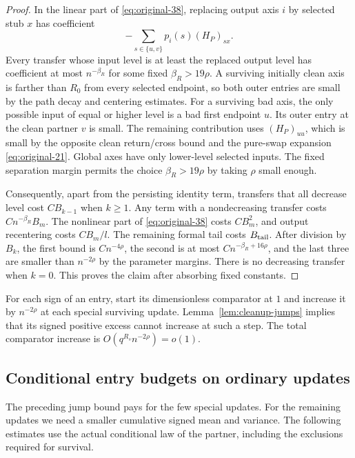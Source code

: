 \begin{proof}
In the linear part of \eqref{eq:original-38}, replacing output
axis $i$ by selected stub $x$ has coefficient
\[
 -\sum_{s\in\{u,v\}}p_i(s)(H_P)_{sx}.
\]
Every transfer whose input level is at least the replaced
output level has coefficient at most $n^{-\beta_R}$ for some
fixed $\beta_R>19\rho$.  A surviving initially clean axis is
farther than $R_0$ from every selected endpoint, so both outer
entries are small by the path decay and centering estimates.
For a surviving bad axis, the only possible input of equal or
higher level is a bad first endpoint $u$.  Its outer entry at
the clean partner $v$ is small.  The remaining contribution
uses $(H_P)_{uu}$, which is small by the opposite clean
return/cross bound and the pure-swap expansion
\eqref{eq:original-21}.  Global axes have only lower-level
selected inputs.  The fixed separation margin permits the
choice $\beta_R>19\rho$ by taking $\rho$ small enough.

Consequently, apart from the persisting identity term, transfers
that all decrease level cost $CB_{k-1}$ when $k\geq1$.
Any term with a nondecreasing transfer costs
$Cn^{-\beta_R}B_m$.  The nonlinear part of
\eqref{eq:original-38} costs $CB_m^2$, and output recentering
costs $CB_m/l$.  The remaining formal tail costs $B_{\rm tail}$.
After division by $B_k$, the first bound is $Cn^{-4\rho}$,
the second is at most $Cn^{-\beta_R+16\rho}$, and the last
three are smaller than $n^{-2\rho}$ by the parameter margins.
There is no decreasing transfer when $k=0$.  This proves the
claim after absorbing fixed constants.
\end{proof}

For each sign of an entry, start its dimensionless comparator
at $1$ and increase it by $n^{-2\rho}$ at each special
surviving update.  Lemma~\ref{lem:cleanup-jumps} implies that
its signed positive excess cannot increase at such a step.
The total comparator increase is
$O(q^{R_s}n^{-2\rho})=o(1)$.

\subsection{Conditional entry budgets on ordinary updates}

The preceding jump bound pays for the few special updates.  For the
remaining updates we need a smaller cumulative signed mean and
variance.  The following estimates use the actual conditional law of
the partner, including the exclusions required for survival.

